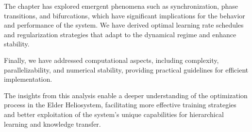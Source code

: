 The chapter has explored emergent phenomena such as synchronization, phase transitions, and bifurcations, which have significant implications for the behavior and performance of the system. We have derived optimal learning rate schedules and regularization strategies that adapt to the dynamical regime and enhance stability.

Finally, we have addressed computational aspects, including complexity, parallelizability, and numerical stability, providing practical guidelines for efficient implementation.

The insights from this analysis enable a deeper understanding of the optimization process in the Elder Heliosystem, facilitating more effective training strategies and better exploitation of the system's unique capabilities for hierarchical learning and knowledge transfer.